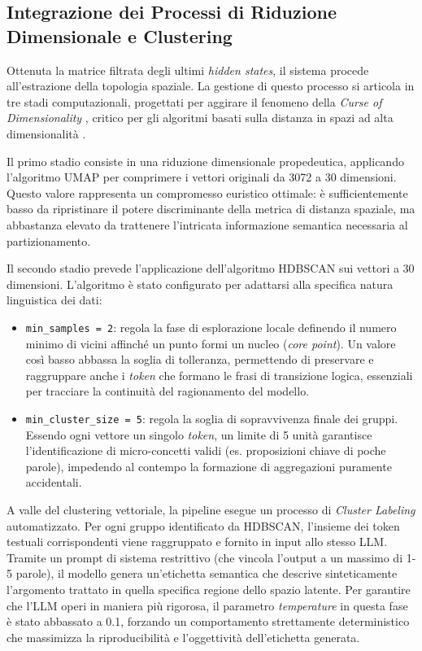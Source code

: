 \subsection{Integrazione dei Processi di Riduzione Dimensionale e Clustering}
\label{sec:integrazione_riduzione_clustering}

Ottenuta la matrice filtrata degli ultimi \textit{hidden states}, il sistema procede all'estrazione della topologia spaziale. La gestione di questo processo si articola in tre stadi computazionali, progettati per aggirare il fenomeno della \textit{Curse of Dimensionality} \cite{bellman1961adaptive}, critico per gli algoritmi basati sulla distanza in spazi ad alta dimensionalità \cite{altman2018curse}.

Il primo stadio consiste in una riduzione dimensionale propedeutica, applicando l'algoritmo UMAP per comprimere i vettori originali da 3072 a 30 dimensioni. Questo valore rappresenta un compromesso euristico ottimale: è sufficientemente basso da ripristinare il potere discriminante della metrica di distanza spaziale, ma abbastanza elevato da trattenere l'intricata informazione semantica necessaria al partizionamento. 

Il secondo stadio prevede l'applicazione dell'algoritmo HDBSCAN sui vettori a 30 dimensioni. L'algoritmo è stato configurato per adattarsi alla specifica natura linguistica dei dati:
\begin{itemize}
    \item \texttt{min\_samples = 2}: regola la fase di esplorazione locale definendo il numero minimo di vicini affinché un punto formi un nucleo (\textit{core point}). Un valore così basso abbassa la soglia di tolleranza, permettendo di preservare e raggruppare anche i \textit{token} che formano le frasi di transizione logica, essenziali per tracciare la continuità del ragionamento del modello.
    \item \texttt{min\_cluster\_size = 5}: regola la soglia di sopravvivenza finale dei gruppi. Essendo ogni vettore un singolo \textit{token}, un limite di 5 unità garantisce l'identificazione di micro-concetti validi (es. proposizioni chiave di poche parole), impedendo al contempo la formazione di aggregazioni puramente accidentali.
\end{itemize}

A valle del clustering vettoriale, la pipeline esegue un processo di \textit{Cluster Labeling} automatizzato. Per ogni gruppo identificato da HDBSCAN, l'insieme dei token testuali corrispondenti viene raggruppato e fornito in input allo stesso LLM. Tramite un prompt di sistema restrittivo (che vincola l'output a un massimo di 1-5 parole), il modello genera un'etichetta semantica che descrive sinteticamente l'argomento trattato in quella specifica regione dello spazio latente. Per garantire che l'LLM operi in maniera più  rigorosa, il parametro \textit{temperature} in questa fase è stato abbassato a 0.1, forzando un comportamento strettamente deterministico che massimizza la riproducibilità e l'oggettività dell'etichetta generata.

